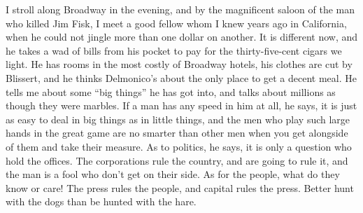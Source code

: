 \documentclass{book}
\begin{document}
I stroll along Broadway in the evening, and by the magnificent saloon of the man who killed Jim Fisk, I meet a good fellow whom I knew years ago in California, when he could not jingle more than one dollar on another. It is different now, and he takes a wad of bills from his pocket to pay for the thirty-five-cent cigars we light. He has rooms in the most costly of Broadway hotels, his clothes are cut by Blissert, and he thinks Delmonico’s about the only place to get a decent meal. He tells me about some “big things” he has got into, and talks about millions as though they were marbles. If a man has any speed in him at all, he says, it is just as easy to deal in big things as in little things, and the men who play such large hands in the great game are no smarter than other men when you get alongside of them and take their measure. As to politics, he says, it is only a question who hold the offices. The corporations rule the country, and are going to rule it, and the man is a fool who don’t get on their side. As for the people, what do they know or care! The press rules the people, and capital rules the press. Better hunt with the dogs than be hunted with the hare.
\end{document}
